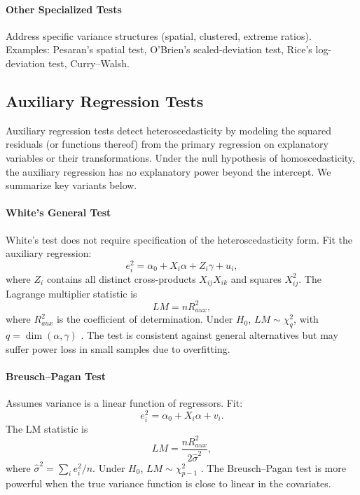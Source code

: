 \paragraph{Other Specialized Tests} Address specific variance structures (spatial, clustered, extreme ratios). Examples: Pesaran’s spatial test, O’Brien’s scaled-deviation test, Rice’s log-deviation test, Curry--Walsh.

\subsection{Auxiliary Regression Tests}\label{sec:aux-regression}
Auxiliary regression tests detect heteroscedasticity by modeling the squared residuals (or functions thereof) from the primary regression on explanatory variables or their transformations. Under the null hypothesis of homoscedasticity, the auxiliary regression has no explanatory power beyond the intercept. We summarize key variants below.

\paragraph{White’s General Test}\label{sec:white}
White’s test does not require specification of the heteroscedasticity form. Fit the auxiliary regression:
\begin{equation}
  e_i^2 = \alpha_0 + X_i\alpha + Z_i\gamma + u_i,
\end{equation}
where $Z_i$ contains all distinct cross-products $X_{ij}X_{ik}$ and squares $X_{ij}^2$. The Lagrange multiplier statistic is
\[ LM = n R^2_{aux}, \]
where $R^2_{aux}$ is the coefficient of determination. Under $H_0$, $LM\sim\chi^2_q$, with $q=\dim(\alpha,\gamma)$ \citep{white1980heteroskedasticity}. The test is consistent against general alternatives but may suffer power loss in small samples due to overfitting.

\paragraph{Breusch–Pagan Test}\label{sec:bp}
Assumes variance is a linear function of regressors. Fit:
\begin{equation}
  e_i^2 = \alpha_0 + X_i\alpha + v_i.
\end{equation}
The LM statistic is
\[ LM = \frac{n R^2_{aux}}{2\hat{\sigma}^2}, \]
where $\hat{\sigma}^2=\sum_i e_i^2/n$. Under $H_0$, $LM\sim\chi^2_{p-1}$ \citep{breusch1979simple}. The Breusch–Pagan test is more powerful when the true variance function is close to linear in the covariates.

